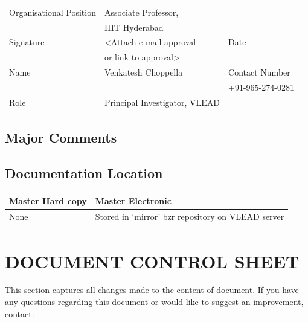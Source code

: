 \documentclass[11pt]{article}
\begin{document}
\begin{center}
\begin{tabular}{lll}
\hline
 Organisational Position  &  Associate Professor,           &                    \\
                          &  IIIT Hyderabad                 &                    \\
 Signature                &  <Attach e-mail approval        &  Date              \\
                          &  or link to approval>           &                    \\
 Name                     &  Venkatesh Choppella            &  Contact Number    \\
                          &                                 &  +91-965-274-0281  \\
 Role                     &  Principal Investigator, VLEAD  &                    \\
\hline
\end{tabular}
\end{center}



\subsection{Major Comments}
\label{sec-15.1}

   
\subsection{Documentation Location}
\label{sec-15.2}


\begin{center}
\begin{tabular}{ll}
\hline
 Master Hard copy  &  Master Electronic                                  \\
\hline
 None              &  Stored in `mirror' bzr repository on VLEAD server  \\
\hline
\end{tabular}
\end{center}


  
\section{DOCUMENT CONTROL SHEET}
\label{sec-16}

This section captures all changes made to the content of document. If
you have any questions regarding this document or would like to
suggest an improvement, contact:
\end{document}
